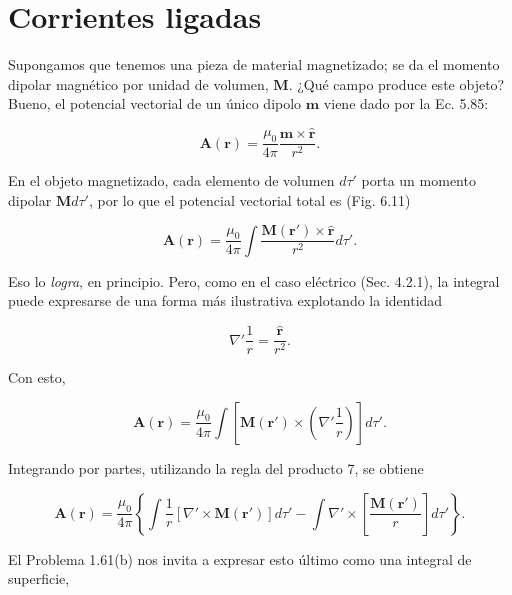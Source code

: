 \documentclass[12pt,a4paper]{report}
\newcommand{\esp}{\vspace{0.5cm}}
\begin{document}
	\section{Corrientes ligadas}
	
	Supongamos que tenemos una pieza de material magnetizado; se da el momento dipolar magnético por unidad de volumen, $\mathbf{M}$. ¿Qué campo produce este objeto? Bueno, el potencial vectorial de un único dipolo $\mathbf{m}$ viene dado por la Ec. 5.85:
	
	\begin{equation}
		\mathbf{A}(\mathbf{r}) = \frac{\mu_0}{4\pi} \frac{\mathbf{m} \times \hat{\boldsymbol{r}}}{r^2}. \tag{6.10}
	\end{equation}
	
	En el objeto magnetizado, cada elemento de volumen $d\tau'$ porta un momento dipolar $\mathbf{M} d\tau'$, por lo que el potencial vectorial total es (Fig. 6.11)
	
	\begin{equation}
		\mathbf{A}(\mathbf{r}) = \frac{\mu_0}{4\pi} \int \frac{\mathbf{M}(\mathbf{r}') \times \hat{\boldsymbol{r}}}{r^2} d\tau'. \tag{6.11}
	\end{equation}
	
	Eso lo \textit{logra}, en principio. Pero, como en el caso eléctrico (Sec. 4.2.1), la integral puede expresarse de una forma más ilustrativa explotando la identidad
	
	\begin{equation*}
		\nabla' \frac{1}{r} = \frac{\hat{\boldsymbol{r}}}{r^2}.
	\end{equation*}
	
	Con esto,
	
	\begin{equation*}
		\mathbf{A}(\mathbf{r}) = \frac{\mu_0}{4\pi} \int \left[ \mathbf{M}(\mathbf{r}') \times \left( \nabla' \frac{1}{r} \right) \right] d\tau'.
	\end{equation*}
	
	Integrando por partes, utilizando la regla del producto 7, se obtiene
	
	\begin{equation*}
		\mathbf{A}(\mathbf{r}) = \frac{\mu_0}{4\pi} \left\{ \int \frac{1}{r} [\nabla' \times \mathbf{M}(\mathbf{r}')] d\tau' - \int \nabla' \times \left[ \frac{\mathbf{M}(\mathbf{r}')}{r} \right] d\tau' \right\}.
	\end{equation*}
	
	\esp
	
	El Problema 1.61(b) nos invita a expresar esto último como una integral de superficie,
	
\end{document}
